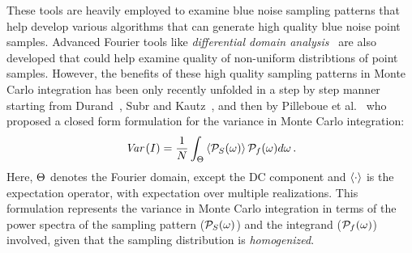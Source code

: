 These tools are heavily employed to examine blue noise sampling patterns that help develop various algorithms that can generate high quality blue noise point samples. 
Advanced Fourier tools like \emph{differential domain analysis}~\cite{Wei:2011:DDA} are also developed that could help examine quality of non-uniform distribtions of point samples. However, 
the benefits of these high quality sampling patterns in Monte Carlo integration has been only recently unfolded in a step by step manner starting from Durand~\cite{durand2011frequency}, Subr and Kautz~\cite{Subr:2013:FAS}, and then by Pilleboue et al.~\cite{Pilleboue:2015:VAM} who proposed a closed form formulation for the variance in Monte Carlo integration:
%
\begin{align}
\textit{Var}\left({I}\right) = \frac{1}{N} \int_{{\Theta}} \left\langle \mathcal{P}_{S}(\mathbf{\omega}) \right\rangle \mathcal{P}_{{f}}(\mathbf{\omega}) d \mathbf{\omega} \,.
\end{align}
%
Here, ${\Theta}$ denotes the Fourier domain, except the DC component and $\left\langle \cdot \right\rangle$ is the expectation operator, with expectation over multiple realizations. This formulation  
represents the variance in Monte Carlo integration in terms of the power spectra of the sampling pattern 
($\mathcal{P}_{S}(\mathbf{\omega})$) and the integrand ($\mathcal{P}_{{f}}(\mathbf{\omega})$) involved, given that the sampling distribution is \emph{homogenized}.